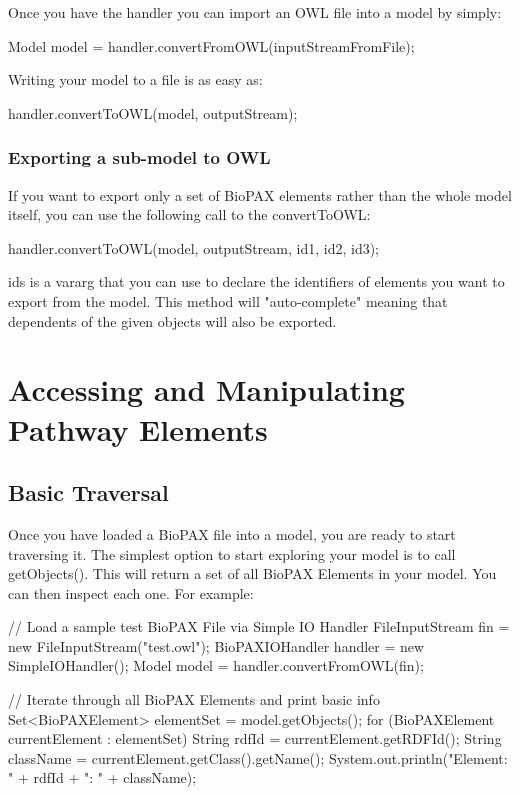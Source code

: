 \documentclass{tufte-book}
\begin{document}
Once you have the handler you can import an OWL file into a model by simply:

\begin{javacode}
Model model = handler.convertFromOWL(inputStreamFromFile);
\end{javacode}


Writing your model to a file is as easy as: 

\begin{javacode}
handler.convertToOWL(model, outputStream);
\end{javacode}


\subsection{Exporting a sub-model to OWL}

If you want to export only a set of BioPAX elements rather than the whole model itself, you can use the following call to the convertToOWL:

\begin{javacode}
handler.convertToOWL(model, outputStream, id1, id2, id3);
\end{javacode}


ids is a vararg that you can use to declare the identifiers of elements you want to export from the model. This method will "auto-complete" meaning that dependents of the given objects will also be exported.

\chapter{Accessing and Manipulating Pathway Elements}

\section{Basic Traversal} 

Once you have loaded a BioPAX file into a model, you are ready to start traversing it.
The simplest option to start exploring your model is to call getObjects(). This will return a set of all BioPAX Elements in your model. You can then inspect each one. For example:

\begin{javacode}
// Load a sample test BioPAX File via Simple IO Handler
FileInputStream fin = new FileInputStream("test.owl");
BioPAXIOHandler handler = new SimpleIOHandler();
Model model = handler.convertFromOWL(fin);

// Iterate through all BioPAX Elements and print basic info
Set<BioPAXElement> elementSet = model.getObjects();
for (BioPAXElement currentElement : elementSet)
{
 String rdfId = currentElement.getRDFId();
 String className = 
 currentElement.getClass().getName();
 System.out.println("Element: " + rdfId + ": " + className);
}
\end{javacode}
\end{document}
